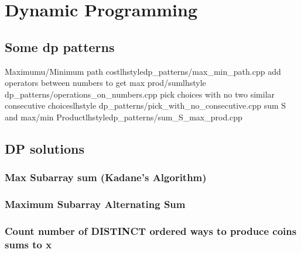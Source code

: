 \section{Dynamic Programming}
  \subsection{Some dp patterns}
        {Maximumu/Minimum path cost}{lhstyle}{dp_patterns/max_min_path.cpp}
        {add operators between numbers to get max prod/sum}{lhstyle} {dp_patterns/operations_on_numbers.cpp}
        {pick choices with no two similar consecutive choices}{lhstyle} {dp_patterns/pick_with_no_consecutive.cpp}
        {sum S and max/min Product}{lhstyle}{dp_patterns/sum_S_max_prod.cpp}

   \subsection{DP solutions}
       \subsubsection{Max Subarray sum (Kadane’s Algorithm)}

       \subsubsection{Maximum Subarray Alternating Sum}


     \subsubsection{Count number of DISTINCT ordered ways to produce coins sums to x}

